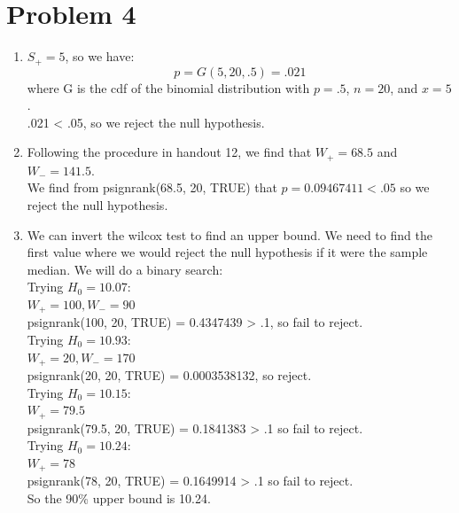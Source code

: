 \documentclass{article}
\begin{document}
\section*{Problem 4}
\begin{enumerate}
\item $S_+ = 5$, so we have: \\
\[
p = G(5, 20, .5) = .021
\]
where G is the cdf of the binomial distribution with $p = .5$, $n = 20$, and $x = 5$. \\
.021 < .05, so we reject the null hypothesis. \\
\item Following the procedure in handout 12, we find that $W_+ = 68.5$ and $W_- = 141.5$. \\
We find from psignrank(68.5, 20, TRUE) that $p = 0.09467411 < .05$ so we reject the null hypothesis. 
\item We can invert the wilcox test to find an upper bound. We need to find the first value where we would reject the null hypothesis if it were the sample median. We will do a binary search: \\
Trying $H_0 = 10.07$: \\
$W_+ = 100, W_- = 90$ \\
psignrank(100, 20, TRUE)  = 0.4347439 > .1, so fail to reject. \\
Trying $H_0 = 10.93$: \\
$W_+ = 20, W_- = 170$ \\
psignrank(20, 20, TRUE) = 0.0003538132, so reject. \\
Trying $H_0 = 10.15$: \\
$W_+ = 79.5$ \\
psignrank(79.5, 20, TRUE) = 0.1841383 > .1 so fail to reject. \\
Trying $H_0 = 10.24$: \\
$W_+ = 78$ \\
psignrank(78, 20, TRUE) = 0.1649914 > .1 so fail to reject. \\
So the 90\% upper bound is 10.24. 
\end{enumerate}
\end{document}
